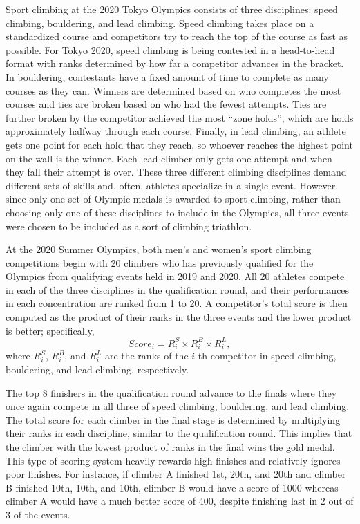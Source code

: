 \documentclass[12pt]{article}
\begin{document}
Sport climbing at the 2020 Tokyo Olympics consists of three disciplines:
speed climbing, bouldering, and lead climbing. Speed climbing takes
place on a standardized course and competitors try to reach the top of
the course as fast as possible. For Tokyo 2020, speed climbing is being
contested in a head-to-head format with ranks determined by how far a
competitor advances in the bracket. In bouldering, contestants have a
fixed amount of time to complete as many courses as they can. Winners
are determined based on who completes the most courses and ties are
broken based on who had the fewest attempts. Ties are further broken by
the competitor achieved the most ``zone holds'', which are holds
approximately halfway through each course. Finally, in lead climbing, an
athlete gets one point for each hold that they reach, so whoever reaches
the highest point on the wall is the winner. Each lead climber only gets
one attempt and when they fall their attempt is over. These three
different climbing disciplines demand different sets of skills and,
often, athletes specialize in a single event. However, since only one
set of Olympic medals is awarded to sport climbing, rather than choosing
only one of these disciplines to include in the Olympics, all three
events were chosen to be included as a sort of climbing triathlon.

At the 2020 Summer Olympics, both men's and women's sport climbing
competitions begin with 20 climbers who has previously qualified for the
Olympics from qualifying events held in 2019 and 2020. All 20 athletes
compete in each of the three disciplines in the qualification round, and
their performances in each concentration are ranked from 1 to 20. A
competitor's total score is then computed as the product of their ranks
in the three events and the lower product is better; specifically,
\begin{equation}
Score_i = R^S_i\times R^B_i\times R^L_i,
\end{equation} where \(R^S_i\), \(R^B_i\), and \(R^L_i\) are the ranks
of the \(i\)-th competitor in speed climbing, bouldering, and lead
climbing, respectively.

The top 8 finishers in the qualification round advance to the finals
where they once again compete in all three of speed climbing,
bouldering, and lead climbing. The total score for each climber in the
final stage is determined by multiplying their ranks in each discipline,
similar to the qualification round. This implies that the climber with
the lowest product of ranks in the final wins the gold medal. This type
of scoring system heavily rewards high finishes and relatively ignores
poor finishes. For instance, if climber A finished 1st, 20th, and 20th
and climber B finished 10th, 10th, and 10th, climber B would have a
score of 1000 whereas climber A would have a much better score of 400,
despite finishing last in 2 out of 3 of the events.
\end{document}
